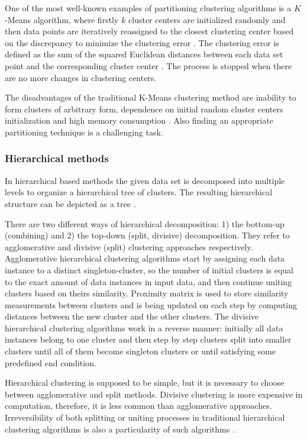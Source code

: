 One of the most well-known examples of partitioning clustering algorithms is a $K$-Means algorithm, where firstly $k$ cluster centers are initialized randomly and then data points are iteratively reassigned to the closest clustering center based on the discrepancy to minimize the clustering error \cite{article:23_survey_ca}. The clustering error is defined as the sum of the squared Euclidean distances between each data set point and the corresponding cluster center \cite{article:24_glkkm_cl_fs}. The process is stopped when there are no more changes in clustering centers.

The disadvantages of the traditional K-Means clustering method are inability to form clusters of arbitrary form, dependence on initial random cluster centers initialization and high memory consumption \cite{article:8_review_mot_cl_alg}. Also finding an appropriate partitioning technique is a challenging task.

\subsubsection{Hierarchical methods}
In hierarchical based methods the given data set is decomposed into multiple levels to organize a hierarchical tree of clusters. The resulting hierarchical structure can be depicted as a tree \cite{article:23_survey_ca}.

There are two different ways of hierarchical decomposition: 1) the bottom-up (combining) and 2) the top-down (split, divisive) decomposition. They refer to agglomerative and divisive (split) clustering approaches respectively. Agglomerative hierarchical clustering algorithms start by assigning each data instance to a distinct singleton-cluster, so the number of initial clusters is equal to the exact amount of data instances in input data, and then continue uniting clusters based on theirs similarity. Proximity matrix is used to store similarity measurements between clusters and is being updated on each step by computing distances between the new cluster and the other clusters. The divisive hierarchical clustering algorithms work in a reverse manner: initially all data instances belong to one cluster and then step by step clusters split into smaller clusters until all of them become singleton clusters or until satisfying some predefined end condition.

Hierarchical clustering is supposed to be simple, but it is necessary to choose between agglomerative and split methods. Divisive clustering is more expensive in computation, therefore, it is less common than agglomerative approaches. Irreversibility of both splitting or uniting processes in traditional hierarchical clustering algorithms is also a particularity of such algorithms \cite{article:8_review_mot_cl_alg}.

